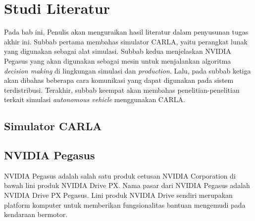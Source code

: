 \chapter{Studi Literatur}

Pada bab ini, Penulis akan menguraikan hasil literatur dalam penyusunan tugas
akhir ini. Subbab pertama membahas simulator CARLA, yaitu perangkat lunak yang
digunakan sebagai alat simulasi. Subbab kedua menjelaskan NVIDIA Pegasus yang
akan digunakan sebagai mesin untuk menjalankan algoritma \textit{decision
    making} di lingkungan simulasi dan \textit{production}. Lalu, pada subbab
ketiga akan dibahas beberapa cara komunikasi yang dapat digunakan pada sistem
terdistribusi. Terakhir, subbab keempat akan membahas penelitian-penelitian
terkait simulasi \textit{autonomous vehicle} menggunakan CARLA.

\section{Simulator CARLA}
\blindtext


\section{NVIDIA Pegasus}

NVIDIA Pegasus adalah salah satu produk cetusan NVIDIA Corporation di bawah
lini produk NVIDIA Drive PX. Nama pasar dari NVIDIA Pegasus adalah NVIDIA Drive
PX Pegasus. Lini produk NVIDIA Drive sendiri merupakan platform komputer untuk
memberikan fungsionalitas bantuan mengemudi pada kendaraan bermotor.

